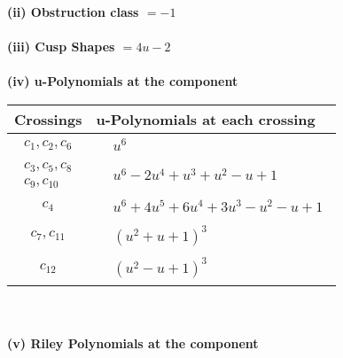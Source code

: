 \documentclass[1p]{elsarticle_modified}
\theoremstyle{definition}
\begin{document}
\flushleft \textbf{(ii) Obstruction class $= -1$}\\~\\
\flushleft \textbf{(iii) Cusp Shapes $= 4 u-2$}\\~\\
\newpage\renewcommand{\arraystretch}{1}
\flushleft \textbf{(iv) u-Polynomials at the component}\newline \\
\begin{tabular}{m{50pt}|m{274pt}}
Crossings & \hspace{64pt}u-Polynomials at each crossing \\
\hline $$\begin{aligned}c_{1},c_{2},c_{6}\end{aligned}$$&$\begin{aligned}
&u^6
\end{aligned}$\\
\hline $$\begin{aligned}c_{3},c_{5},c_{8}\\c_{9},c_{10}\end{aligned}$$&$\begin{aligned}
&u^6-2 u^4+u^3+u^2- u+1
\end{aligned}$\\
\hline $$\begin{aligned}c_{4}\end{aligned}$$&$\begin{aligned}
&u^6+4 u^5+6 u^4+3 u^3- u^2- u+1
\end{aligned}$\\
\hline $$\begin{aligned}c_{7},c_{11}\end{aligned}$$&$\begin{aligned}
&(u^2+u+1)^3
\end{aligned}$\\
\hline $$\begin{aligned}c_{12}\end{aligned}$$&$\begin{aligned}
&(u^2- u+1)^3
\end{aligned}$\\
\hline
\end{tabular}\\~\\
\newpage\renewcommand{\arraystretch}{1}
\flushleft \textbf{(v) Riley Polynomials at the component}\newline \\
\end{document}
